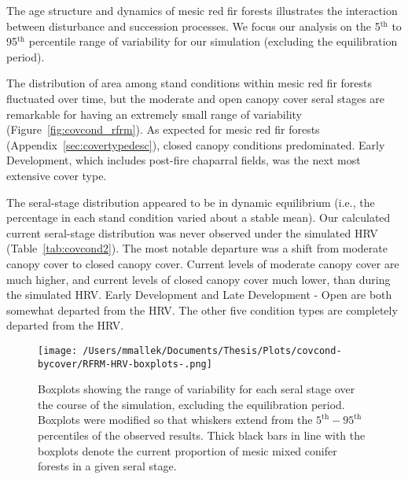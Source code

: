 The age structure and dynamics of mesic red fir forests illustrates the interaction between disturbance and succession processes. We focus our analysis on the 5$^{\text{th}}$ to 95$^{\text{th}}$ percentile range of variability for our simulation (excluding the equilibration period). %

The distribution of area among stand conditions within mesic red fir forests fluctuated over time, but the moderate and open canopy cover seral stages are remarkable for having an extremely small range of variability (Figure~\ref{fig:covcond_rfrm}). As expected for mesic red fir forests (Appendix~\ref{sec:covertypedesc}), closed canopy conditions predominated. Early Development, which includes post-fire chaparral fields, was the next most extensive cover type. %

The seral-stage distribution appeared to be in dynamic equilibrium (i.e., the percentage in each stand condition varied about a stable mean). Our calculated current seral-stage distribution was never observed under the simulated HRV (Table~\ref{tab:covcond2}). The most notable departure was a shift from moderate canopy cover to closed canopy cover. Current levels of moderate canopy cover are much higher, and current levels of closed canopy cover much lower, than during the simulated HRV. Early Development and Late Development - Open are both somewhat departed from the HRV. The other five condition types are completely departed from the HRV. 

\begin{figure}[!htbp]
  \centering
    \texttt{[image: /Users/mmallek/Documents/Thesis/Plots/covcond-bycover/RFRM-HRV-boxplots-.png]}
  \caption{Boxplots showing the range of variability for each seral stage over the course of the simulation, excluding the equilibration period. Boxplots were modified so that whiskers extend from the $5^{\text{th}} - 95^{\text{th}}$ percentiles of the observed results. Thick black bars in line with the boxplots denote the current proportion of mesic mixed conifer forests in a given seral stage.} 
  \label{fig:covcond_RFRM_boxplots}
\end{figure}

